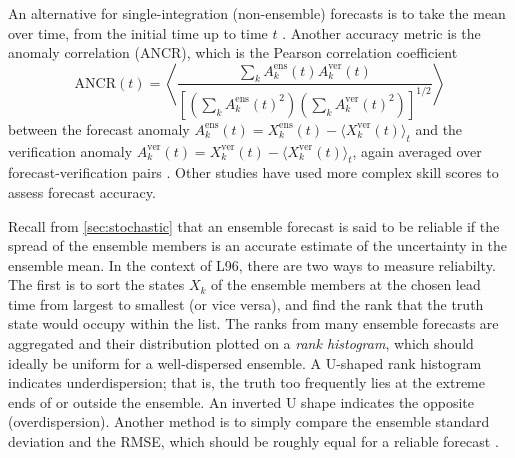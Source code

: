 \documentclass[titlepage,twoside]{article}
\numberwithin{equation}{section}
\begin{document}
An alternative for single-integration
(non-ensemble) forecasts is to take the mean over time, from the initial time
up to time $t$ \parencite{bhouri2023}. Another accuracy metric is the
anomaly correlation (ANCR), which is the Pearson correlation coefficient
\begin{equation*}
    \mathrm{ANCR}(t) = \left\langle
        \frac{
            \sum_k A_k^\text{ens}(t) A_k^\text{ver}(t)
        }{
            \left[
                \left( \sum_k A_k^\text{ens}(t)^2 \right)
                \left( \sum_k A_k^\text{ver}(t)^2 \right)
            \right]^{1/2}
        }
    \right\rangle
\end{equation*}
between the forecast anomaly
$A_k^\text{ens}(t) = X_k^\text{ens}(t) - \langle X_k^\text{ver}(t) \rangle_t$
and the verification anomaly
$A_k^\text{ver}(t) = X_k^\text{ver}(t) - \langle X_k^\text{ver}(t) \rangle_t$,
again averaged over forecast-verification pairs \parencite{crommelin2008}.
Other studies \parencite{kwasniok2012,arnold2013} have used more complex
skill scores to assess forecast accuracy.

Recall from \cref{sec:stochastic} that an ensemble forecast is said to be
reliable if the spread of the ensemble members is an accurate estimate of the
uncertainty in the ensemble mean. In the context of L96, there are two ways to
measure reliabilty. The first \parencite{wilks2005,crommelin2008,kwasniok2012}
is to sort the states $X_k$ of the ensemble members at the chosen lead time
from largest to smallest (or vice versa), and find the rank that the truth
state would occupy within the list. The ranks from many ensemble forecasts are
aggregated and their distribution plotted on a \emph{rank histogram}, which
should ideally be uniform for a well-dispersed ensemble. A U-shaped rank
histogram indicates underdispersion; that is, the truth too frequently lies at
the extreme ends of or outside the ensemble. An inverted U shape indicates the
opposite (overdispersion). Another method is to simply compare the ensemble
standard deviation and the RMSE, which should be roughly equal for a reliable
forecast \parencite{arnold2013,gagne2020}.
\end{document}
